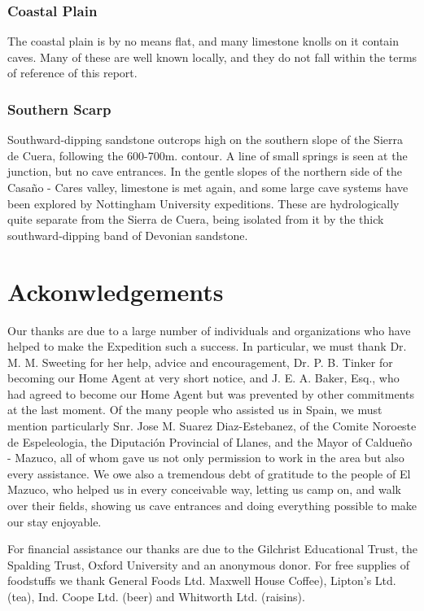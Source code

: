 \documentclass[11pt, a4paper, twoside]{memoir}
\begin{document}
\subsection*{Coastal Plain}

The coastal plain is by no means flat, and many limestone knolls on it contain caves. Many of these are well known locally, and they do not fall within the terms of reference of this report.


\subsection*{Southern Scarp}

Southward-dipping sandstone outcrops high on the southern slope of the Sierra de Cuera, following the 600-700m. contour. A line of small springs is seen at the junction, but no cave entrances. In the gentle slopes of the northern side of the Casaño - Cares valley, limestone is met again, and some large cave systems have been explored by Nottingham University expeditions. These are hydrologically quite separate from the Sierra de Cuera, being isolated from it by the thick southward-dipping band of Devonian sandstone.


\chapter{Ackonwledgements}


Our thanks are due to a large number of individuals and organizations who have helped to make the Expedition such a success. In particular, we must thank Dr. M. M. Sweeting for her help, advice and encouragement, Dr. P. B. Tinker for becoming our Home Agent at very short notice, and J. E. A. Baker, Esq., who had agreed to become our Home Agent but was prevented by other commitments at the last moment. Of the many people who assisted us in Spain, we must mention particularly Snr. Jose M. Suarez Diaz-Estebanez, of the Comite Noroeste de Espeleologia, the Diputación Provincial of Llanes, and the Mayor of Caldueño - Mazuco, all of whom gave us not only permission to work in the area but also every assistance. We owe also a tremendous debt of gratitude to the people of El Mazuco, who helped us in every conceivable way, letting us camp on, and walk over their fields, showing us cave entrances and doing everything possible to make our stay enjoyable.

For financial assistance our thanks are due to the Gilchrist Educational Trust, the Spalding Trust, Oxford University and an anonymous donor. For free supplies of foodstuffs we thank General Foods Ltd. Maxwell House Coffee), Lipton's Ltd. (tea), Ind. Coope Ltd. (beer) and Whitworth Ltd. (raisins).
\end{document}

